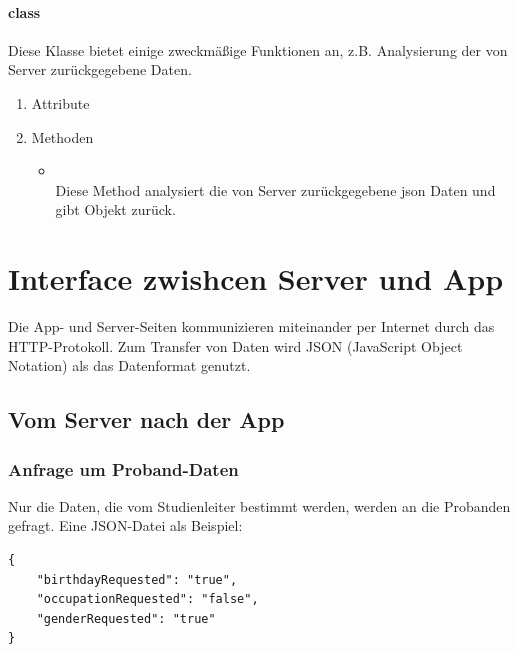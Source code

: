 \documentclass[a4paper]{scrreprt}
\begin{document}
                \subsubsection{class }

                    Diese Klasse bietet einige zweckmäßige Funktionen an, z.B. Analysierung der  von Server zurückgegebene Daten.

                    \begin{enumerate}
                        \item Attribute
                        \item Methoden
                            \begin{itemize}
                                \item {}\\
                                Diese Method analysiert die von Server zurückgegebene json Daten und gibt  Objekt zurück.
                            \end{itemize}
                    \end{enumerate}
            
            
    \chapter{Interface zwishcen Server und App}
        Die App- und Server-Seiten kommunizieren miteinander per Internet durch das HTTP-Protokoll. Zum Transfer von Daten wird JSON (JavaScript Object Notation) als das Datenformat genutzt.
        
        \section{Vom Server nach der App}
            \subsection{Anfrage um Proband-Daten}
                Nur die Daten, die vom Studienleiter bestimmt werden, werden an die Probanden gefragt. Eine JSON-Datei als Beispiel:
                \begin{lstlisting}
{
    "birthdayRequested": "true",
    "occupationRequested": "false",
    "genderRequested": "true"
}
                \end{lstlisting}
            
\end{document}
